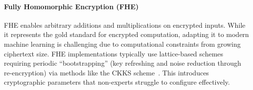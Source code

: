 
\paragraph{Fully Homomorphic Encryption (FHE)} FHE enables arbitrary additions and multiplications on encrypted inputs. While it represents the gold standard for encrypted computation, adapting it to modern machine learning is challenging due to computational constraints from growing ciphertext size. FHE implementations typically use lattice-based schemes requiring periodic ``bootstrapping'' (key refreshing and noise reduction through re-encryption) via methods like the CKKS scheme~\cite{cheon2017homomorphic}. This introduces cryptographic parameters that non-experts struggle to configure effectively.






